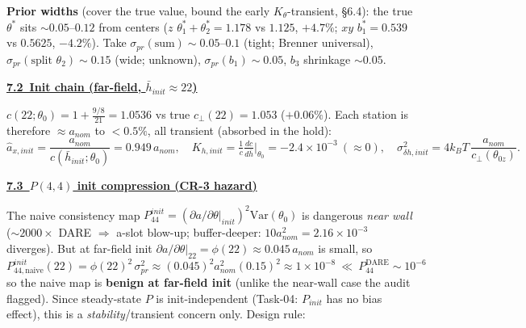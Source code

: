 \documentclass[11pt,a4paper,fontset=none]{ctexart}
\newcommand{\hd}[1]{\par\medskip\noindent\underline{\textbf{#1}}\par\nobreak\vspace{0.2ex}}
\begin{document}
\textbf{Prior widths} (cover the true value, bound the early $K_\theta$-transient, \S6.4): the true $\theta^\ast$ sits $\sim\!0.05$--$0.12$ from centers ($z$ $\theta_1^\ast{+}\theta_2^\ast{=}1.178$ vs $1.125$, $+4.7\%$; $xy$ $b_1^\ast{=}0.539$ vs $0.5625$, $-4.2\%$). Take $\sigma_{pr}(\text{sum})\!\sim\!0.05$--$0.1$ (tight; Brenner universal), $\sigma_{pr}(\text{split }\theta_2)\!\sim\!0.15$ (wide; unknown), $\sigma_{pr}(b_1)\!\sim\!0.05$, $b_3$ shrinkage $\sim\!0.05$.

\hd{7.2\ Init chain (far-field, $\bar h_{init}\!\approx\!22$)}
$c(22;\theta_0)=1+\tfrac{9/8}{21}=1.0536$ vs true $c_\perp(22){=}1.053$ ($+0.06\%$). Each station is therefore $\approx a_{nom}$ to $<0.5\%$, all transient (absorbed in the hold):
\[ \hat a_{x,init}=\frac{a_{nom}}{c(\bar h_{init};\theta_0)}=0.949\,a_{nom},\quad
   K_{h,init}=\tfrac1c\tfrac{dc}{d\bar h}\Big|_{\theta_0}\!=-2.4{\times}10^{-3}\ (\approx0),\quad
   \sigma^2_{\delta h,init}=4k_BT\,\frac{a_{nom}}{c_\perp(\theta_{0z})}. \]

\hd{7.3\ $P(4,4)$ init compression (CR-3 hazard)}
The naive consistency map $P_{44}^{init}=(\partial a/\partial\theta|_{init})^2\mathrm{Var}(\theta_0)$ is dangerous \emph{near wall} ($\sim\!2000\times$ DARE $\Rightarrow$ a-slot blow-up; buffer-deeper: $10a_{nom}^2{=}2.16{\times}10^{-3}$ diverges). But at far-field init $\partial a/\partial\theta|_{22}=\phi(22)\!\approx\!0.045\,a_{nom}$ is small, so
\[ P_{44,\text{naive}}^{init}(22) = \phi(22)^2\,\sigma_{pr}^2 \approx (0.045)^2 a_{nom}^2 (0.15)^2 \approx 1{\times}10^{-8}\ \ll\ P_{44}^{\mathrm{DARE}}\!\sim\!10^{-6} \]
so the naive map is \textbf{benign at far-field init} (unlike the near-wall case the audit flagged). Since steady-state $P$ is init-independent (Task-04: $P_{init}$ has no bias effect), this is a \emph{stability}/transient concern only. Design rule:

\noindent{}
\end{document}
